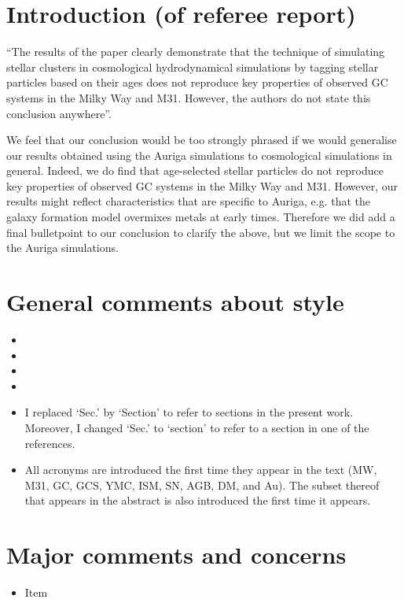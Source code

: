 \documentclass{article}
\begin{document}
\section*{Introduction (of referee report)}
``The results of the paper clearly demonstrate that the technique of simulating
stellar clusters in cosmological hydrodynamical simulations by tagging stellar
particles based on their ages does not reproduce key properties of observed GC 
systems in the Milky Way and M31. However, the authors do not state this conclusion
anywhere''.

We feel that our conclusion would be too strongly phrased if we would generalise 
our results obtained using the Auriga simulations to cosmological simulations 
in general. Indeed, we do find that age-selected stellar particles do not 
reproduce key properties of observed GC systems in the Milky Way and M31. However,
our results might reflect characteristics that are specific to Auriga, 
e.g. that the galaxy formation model overmixes metals at early times. 
Therefore we did add a final bulletpoint to our conclusion to clarify the above, 
but we limit the scope to the Auriga simulations. 

\section*{General comments about style}
\begin{itemize}
\item
\item
\item
\item
\item I replaced `Sec.' by `Section' to refer to sections in the present work.
Moreover, I changed `Sec.' to `section' to refer to a section in one of the references.
\item All acronyms are introduced the first time they appear in the text
(MW, M31, GC, GCS, YMC, ISM, SN, AGB, DM, and Au). The subset thereof that appears 
in the abstract is also introduced the first time it appears.
\end{itemize}


\section*{Major comments and concerns}
\begin{itemize}
\item Item
\end{itemize}
\end{document}
